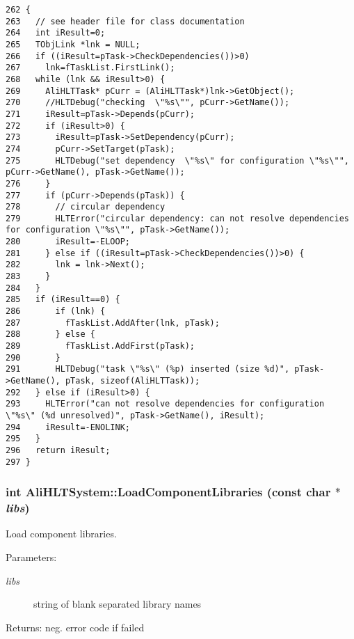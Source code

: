 \footnotesize\begin{verbatim}262 {
263   // see header file for class documentation
264   int iResult=0;
265   TObjLink *lnk = NULL;
266   if ((iResult=pTask->CheckDependencies())>0)
267     lnk=fTaskList.FirstLink();
268   while (lnk && iResult>0) {
269     AliHLTTask* pCurr = (AliHLTTask*)lnk->GetObject();
270     //HLTDebug("checking  \"%s\"", pCurr->GetName());
271     iResult=pTask->Depends(pCurr);
272     if (iResult>0) {
273       iResult=pTask->SetDependency(pCurr);
274       pCurr->SetTarget(pTask);
275       HLTDebug("set dependency  \"%s\" for configuration \"%s\"", pCurr->GetName(), pTask->GetName());
276     }
277     if (pCurr->Depends(pTask)) {
278       // circular dependency
279       HLTError("circular dependency: can not resolve dependencies for configuration \"%s\"", pTask->GetName());
280       iResult=-ELOOP;
281     } else if ((iResult=pTask->CheckDependencies())>0) {
282       lnk = lnk->Next();
283     }
284   }
285   if (iResult==0) {
286       if (lnk) {
287         fTaskList.AddAfter(lnk, pTask);
288       } else {
289         fTaskList.AddFirst(pTask);
290       }
291       HLTDebug("task \"%s\" (%p) inserted (size %d)", pTask->GetName(), pTask, sizeof(AliHLTTask));
292   } else if (iResult>0) {
293     HLTError("can not resolve dependencies for configuration \"%s\" (%d unresolved)", pTask->GetName(), iResult);
294     iResult=-ENOLINK;
295   }
296   return iResult;
297 }
\end{verbatim}\normalsize 


\subsubsection{\setlength{\rightskip}{0pt plus 5cm}int Ali\-HLTSystem::Load\-Component\-Libraries (const char $\ast$ {\em libs})}\label{classAliHLTSystem_a22}


Load component libraries. \begin{Desc}
\item[Parameters:]
\begin{description}
\item[{\em libs}]string of blank separated library names \end{description}
\end{Desc}
\begin{Desc}
\item[Returns:]neg. error code if failed \end{Desc}



